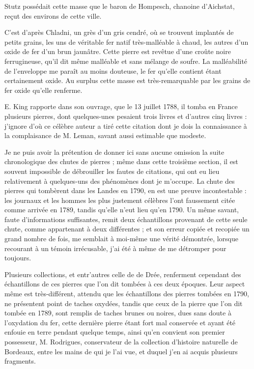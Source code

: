 \documentclass[a4paper, 12pt, oneside, french]{article}
\begin{document}
Stutz possédait cette masse que le baron de Hompesch, chanoine d'Aichstat, reçut des environs de cette ville.

C'est d'après Chladni, un grès d'un gris cendré, où se trouvent implantés de petits grains, les uns de véritable fer natif très-malléable à chaud, les autres d'un oxide de fer d'un brun jaunâtre. Cette pierre est revêtue d'une croûte noire ferrugineuse, qu'il dit même malléable et sans mélange de soufre. La malléabilité de l'enveloppe me paraît au moins douteuse, le fer qu'elle contient étant certainement oxide. Au surplus cette masse est très-remarquable par les grains de fer oxide qu'elle renferme.

E. King rapporte dans son ouvrage, que le 13 juillet 1788, il tomba en France plusieurs pierres, dont quelques-unes pesaient trois livres et d'autres cinq livres : j'ignore d'où ce célèbre auteur a tiré cette citation dont je dois la connaissance à la complaisance de M. Leman, savant aussi estimable que modeste.

Je ne puis avoir la prétention de donner ici sans aucune omission la suite chronologique des chutes de pierres ; même dans cette troisième section, il est souvent impossible de débrouiller les fautes de citations, qui ont eu lieu relativement à quelques-uns des phénomènes dont je m'occupe. La chute des pierres qui tombèrent dans les Landes en 1790, en est une preuve incontestable : les journaux et les hommes les plus justement célèbres l'ont faussement citée comme arrivée en 1789, tandis qu'elle n'eut lieu qu'en 1790. Un même savant, faute d'informations suffisantes, remit deux échantillons provenant de cette seule chute, comme appartenant à deux différentes ; et son erreur copiée et recopiée un grand nombre de fois, me semblait à moi-même une vérité démontrée, lorsque recourant à un témoin irrécusable, j'ai été à même de me détromper pour toujours.

Plusieurs collections, et entr'autres celle de de Drée, renferment cependant des échantillons de ces pierres que l'on dit tombées à ces deux époques. Leur aspect même est très-différent, attendu que les échantillons des pierres tombées en 1790, ne présentent point de taches oxydées, tandis que ceux de la pierre que l'on dit tombée en 1789, sont remplis de taches brunes ou noires, dues sans doute à l'oxydation du fer, cette dernière pierre étant fort mal conservée et ayant été enfouie en terre pendant quelque temps, ainsi qu'en convient son premier possesseur, M. Rodrigues, conservateur de la collection d'histoire naturelle de Bordeaux, entre les mains de qui je l'ai vue, et duquel j'en ai acquis plusieurs fragments.
\end{document}
